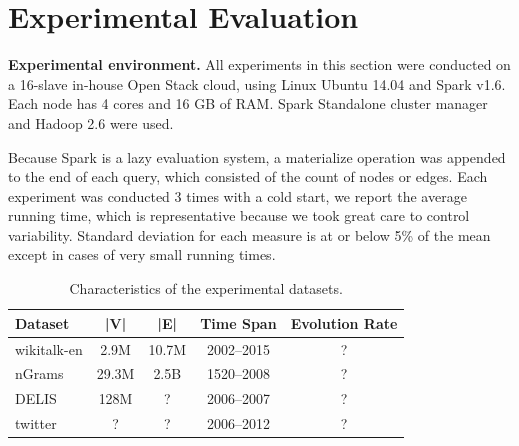 \section{Experimental Evaluation}
\label{sec:exp}

{\bf Experimental environment.} All experiments in this section were
conducted on a 16-slave in-house Open Stack cloud, using Linux Ubuntu
14.04 and Spark v1.6.  Each node has 4 cores and 16 GB of RAM.  Spark
Standalone cluster manager and Hadoop 2.6 were used.

Because Spark is a lazy evaluation system, a materialize operation was
appended to the end of each query, which consisted of the count of
nodes or edges.  Each experiment was conducted 3 times with a cold
start, we report the average running time, which is representative
because we took great care to control variability.  Standard deviation
for each measure is at or below 5\% of the mean except in cases of
very small running times.

\begin{table}
\small
\begin{tabular}{l | c | c | c | c }
\multicolumn{1}{l|}{\bfseries Dataset} & \multicolumn{1}{c|}{\bfseries |V|} & \multicolumn{1}{c|}{\bfseries |E|} & \multicolumn{1}{c}{\bfseries Time Span} & \multicolumn{1}{c}{\bfseries Evolution Rate} \\ \hline
wikitalk-en & 2.9M & 10.7M & 2002--2015 & ? \\ \hline
nGrams & 29.3M & 2.5B & 1520--2008 & ? \\ \hline
DELIS & 128M & ? & 2006--2007 & ? \\ \hline
twitter & ? & ? & 2006--2012 & ? \\ \hline
\end{tabular}
\caption{Characteristics of the experimental datasets.}
\label{tab:datasets}
\end{table}

